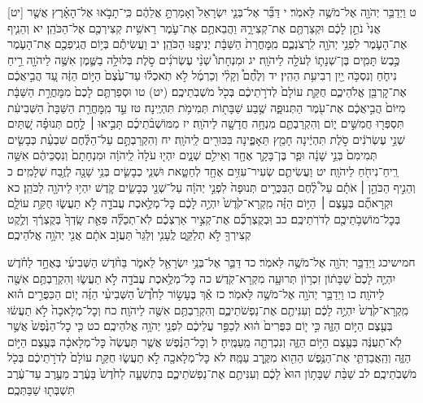 \documentclass[twoside, openany, parskip=half, 11pt]{book}
\begin{document}
[יט] ט וַיְדַבֵּ֥ר יְהֹוָ֖ה אֶל־מֹשֶׁ֥ה לֵּאמֹֽר׃ י דַּבֵּ֞ר אֶל־בְּנֵ֤י יִשְׂרָאֵל֙ וְאָמַרְתָּ֣ אֲלֵהֶ֔ם כִּֽי־תָבֹ֣אוּ אֶל־הָאָ֗רֶץ אֲשֶׁ֤ר אֲנִי֙ נֹתֵ֣ן לָכֶ֔ם וּקְצַרְתֶּ֖ם אֶת־קְצִירָ֑הּ וַהֲבֵאתֶ֥ם אֶת־עֹ֛מֶר רֵאשִׁ֥ית קְצִירְכֶ֖ם אֶל־הַכֹּהֵֽן׃ יא וְהֵנִ֧יף אֶת־הָעֹ֛מֶר לִפְנֵ֥י יְהֹוָ֖ה לִֽרְצֹנְכֶ֑ם מִֽמׇּחֳרַת֙ הַשַּׁבָּ֔ת יְנִיפֶ֖נּוּ הַכֹּהֵֽן׃ יב וַעֲשִׂיתֶ֕ם בְּי֥וֹם הֲנִֽיפְכֶ֖ם אֶת־הָעֹ֑מֶר כֶּ֣בֶשׂ תָּמִ֧ים בֶּן־שְׁנָת֛וֹ לְעֹלָ֖ה לַיהֹוָֽה׃ יג וּמִנְחָתוֹ֩ שְׁנֵ֨י עֶשְׂרֹנִ֜ים סֹ֣לֶת בְּלוּלָ֥ה בַשֶּׁ֛מֶן אִשֶּׁ֥ה לַיהֹוָ֖ה רֵ֣יחַ נִיחֹ֑חַ וְנִסְכֹּ֥ה יַ֖יִן רְבִיעִ֥ת הַהִֽין׃ יד וְלֶ֩חֶם֩ וְקָלִ֨י וְכַרְמֶ֜ל לֹ֣א תֹֽאכְל֗וּ עַד־עֶ֙צֶם֙ הַיּ֣וֹם הַזֶּ֔ה עַ֚ד הֲבִ֣יאֲכֶ֔ם אֶת־קׇרְבַּ֖ן אֱלֹהֵיכֶ֑ם חֻקַּ֤ת עוֹלָם֙ לְדֹרֹ֣תֵיכֶ֔ם בְּכֹ֖ל מֹשְׁבֹֽתֵיכֶֽם׃
(יט) טו וּסְפַרְתֶּ֤ם לָכֶם֙ מִמׇּחֳרַ֣ת הַשַּׁבָּ֔ת מִיּוֹם֙ הֲבִ֣יאֲכֶ֔ם אֶת־עֹ֖מֶר הַתְּנוּפָ֑ה שֶׁ֥בַע שַׁבָּת֖וֹת תְּמִימֹ֥ת תִּהְיֶֽינָה׃ טז עַ֣ד מִֽמׇּחֳרַ֤ת הַשַּׁבָּת֙ הַשְּׁבִיעִ֔ת תִּסְפְּר֖וּ חֲמִשִּׁ֣ים י֑וֹם וְהִקְרַבְתֶּ֛ם מִנְחָ֥ה חֲדָשָׁ֖ה לַיהֹוָֽה׃ יז מִמּוֹשְׁבֹ֨תֵיכֶ֜ם תָּבִ֣יאּוּ ׀ לֶ֣חֶם תְּנוּפָ֗ה שְׁ֚תַּיִם שְׁנֵ֣י עֶשְׂרֹנִ֔ים סֹ֣לֶת תִּהְיֶ֔ינָה חָמֵ֖ץ תֵּאָפֶ֑ינָה בִּכּוּרִ֖ים לַֽיהֹוָֽה׃ יח וְהִקְרַבְתֶּ֣ם עַל־הַלֶּ֗חֶם שִׁבְעַ֨ת כְּבָשִׂ֤ים תְּמִימִם֙ בְּנֵ֣י שָׁנָ֔ה וּפַ֧ר בֶּן־בָּקָ֛ר אֶחָ֖ד וְאֵילִ֣ם שְׁנָ֑יִם יִהְי֤וּ עֹלָה֙ לַֽיהֹוָ֔ה וּמִנְחָתָם֙ וְנִסְכֵּיהֶ֔ם אִשֵּׁ֥ה רֵֽיחַ־נִיחֹ֖חַ לַיהֹוָֽה׃ יט וַעֲשִׂיתֶ֛ם שְׂעִיר־עִזִּ֥ים אֶחָ֖ד לְחַטָּ֑את וּשְׁנֵ֧י כְבָשִׂ֛ים בְּנֵ֥י שָׁנָ֖ה לְזֶ֥בַח שְׁלָמִֽים׃ כ וְהֵנִ֣יף הַכֹּהֵ֣ן ׀ אֹתָ֡ם עַל֩ לֶ֨חֶם הַבִּכֻּרִ֤ים תְּנוּפָה֙ לִפְנֵ֣י יְהֹוָ֔ה עַל־שְׁנֵ֖י כְּבָשִׂ֑ים קֹ֛דֶשׁ יִהְי֥וּ לַיהֹוָ֖ה לַכֹּהֵֽן׃ כא וּקְרָאתֶ֞ם בְּעֶ֣צֶם ׀ הַיּ֣וֹם הַזֶּ֗ה מִֽקְרָא־קֹ֙דֶשׁ֙ יִהְיֶ֣ה לָכֶ֔ם כׇּל־מְלֶ֥אכֶת עֲבֹדָ֖ה לֹ֣א תַעֲשׂ֑וּ חֻקַּ֥ת עוֹלָ֛ם בְּכׇל־מוֹשְׁבֹ֥תֵיכֶ֖ם לְדֹרֹֽתֵיכֶֽם׃ כב וּֽבְקֻצְרְכֶ֞ם אֶת־קְצִ֣יר אַרְצְכֶ֗ם לֹֽא־תְכַלֶּ֞ה פְּאַ֤ת שָֽׂדְךָ֙ בְּקֻצְרֶ֔ךָ וְלֶ֥קֶט קְצִירְךָ֖ לֹ֣א תְלַקֵּ֑ט לֶֽעָנִ֤י וְלַגֵּר֙ תַּעֲזֹ֣ב אֹתָ֔ם אֲנִ֖י יְהֹוָ֥ה אֱלֹהֵיכֶֽם׃

חמישיכג וַיְדַבֵּ֥ר יְהֹוָ֖ה אֶל־מֹשֶׁ֥ה לֵּאמֹֽר׃ כד דַּבֵּ֛ר אֶל־בְּנֵ֥י יִשְׂרָאֵ֖ל לֵאמֹ֑ר בַּחֹ֨דֶשׁ הַשְּׁבִיעִ֜י בְּאֶחָ֣ד לַחֹ֗דֶשׁ יִהְיֶ֤ה לָכֶם֙ שַׁבָּת֔וֹן זִכְר֥וֹן תְּרוּעָ֖ה מִקְרָא־קֹֽדֶשׁ׃ כה כׇּל־מְלֶ֥אכֶת עֲבֹדָ֖ה לֹ֣א תַעֲשׂ֑וּ וְהִקְרַבְתֶּ֥ם אִשֶּׁ֖ה לַיהֹוָֽה׃
כו וַיְדַבֵּ֥ר יְהֹוָ֖ה אֶל־מֹשֶׁ֥ה לֵּאמֹֽר׃ כז אַ֡ךְ בֶּעָשׂ֣וֹר לַחֹ֩דֶשׁ֩ הַשְּׁבִיעִ֨י הַזֶּ֜ה י֧וֹם הַכִּפֻּרִ֣ים ה֗וּא מִֽקְרָא־קֹ֙דֶשׁ֙ יִהְיֶ֣ה לָכֶ֔ם וְעִנִּיתֶ֖ם אֶת־נַפְשֹׁתֵיכֶ֑ם וְהִקְרַבְתֶּ֥ם אִשֶּׁ֖ה לַיהֹוָֽה׃ כח וְכׇל־מְלָאכָה֙ לֹ֣א תַעֲשׂ֔וּ בְּעֶ֖צֶם הַיּ֣וֹם הַזֶּ֑ה כִּ֣י י֤וֹם כִּפֻּרִים֙ ה֔וּא לְכַפֵּ֣ר עֲלֵיכֶ֔ם לִפְנֵ֖י יְהֹוָ֥ה אֱלֹהֵיכֶֽם׃ כט כִּ֤י כׇל־הַנֶּ֙פֶשׁ֙ אֲשֶׁ֣ר לֹֽא־תְעֻנֶּ֔ה בְּעֶ֖צֶם הַיּ֣וֹם הַזֶּ֑ה וְנִכְרְתָ֖ה מֵֽעַמֶּֽיהָ׃ ל וְכׇל־הַנֶּ֗פֶשׁ אֲשֶׁ֤ר תַּעֲשֶׂה֙ כׇּל־מְלָאכָ֔ה בְּעֶ֖צֶם הַיּ֣וֹם הַזֶּ֑ה וְהַֽאֲבַדְתִּ֛י אֶת־הַנֶּ֥פֶשׁ הַהִ֖וא מִקֶּ֥רֶב עַמָּֽהּ׃ לא כׇּל־מְלָאכָ֖ה לֹ֣א תַעֲשׂ֑וּ חֻקַּ֤ת עוֹלָם֙ לְדֹרֹ֣תֵיכֶ֔ם בְּכֹ֖ל מֹשְׁבֹֽתֵיכֶֽם׃ לב שַׁבַּ֨ת שַׁבָּת֥וֹן הוּא֙ לָכֶ֔ם וְעִנִּיתֶ֖ם אֶת־נַפְשֹׁתֵיכֶ֑ם בְּתִשְׁעָ֤ה לַחֹ֙דֶשׁ֙ בָּעֶ֔רֶב מֵעֶ֣רֶב עַד־עֶ֔רֶב תִּשְׁבְּת֖וּ שַׁבַּתְּכֶֽם׃
\end{document}
